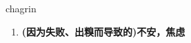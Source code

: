
\begin{frame}
{\huge chagrin}
\begin{center}
\begin{enumerate}\Large
  \item \textbf{(因为失败、出糗而导致的)不安，焦虑}
\end{enumerate}
\end{center}
\end{frame}
